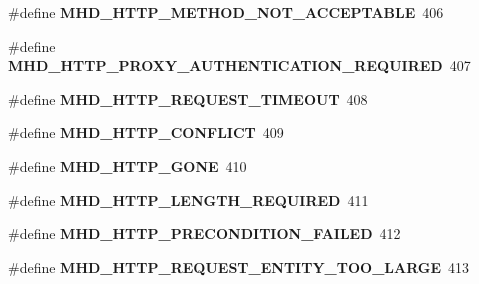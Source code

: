 \begin{DoxyCompactItemize}
\item 
\hypertarget{group__httpcode_ga1b1491025831c8bb6a52dc373b28faac}{\#define {\bfseries \-M\-H\-D\-\_\-\-H\-T\-T\-P\-\_\-\-M\-E\-T\-H\-O\-D\-\_\-\-N\-O\-T\-\_\-\-A\-C\-C\-E\-P\-T\-A\-B\-L\-E}~406}\label{group__httpcode_ga1b1491025831c8bb6a52dc373b28faac}

\item 
\hypertarget{group__httpcode_ga39c76f709f7aba08abdfe97de1ea07e2}{\#define {\bfseries \-M\-H\-D\-\_\-\-H\-T\-T\-P\-\_\-\-P\-R\-O\-X\-Y\-\_\-\-A\-U\-T\-H\-E\-N\-T\-I\-C\-A\-T\-I\-O\-N\-\_\-\-R\-E\-Q\-U\-I\-R\-E\-D}~407}\label{group__httpcode_ga39c76f709f7aba08abdfe97de1ea07e2}

\item 
\hypertarget{group__httpcode_gadd38da158e6694a6d1514006768f6800}{\#define {\bfseries \-M\-H\-D\-\_\-\-H\-T\-T\-P\-\_\-\-R\-E\-Q\-U\-E\-S\-T\-\_\-\-T\-I\-M\-E\-O\-U\-T}~408}\label{group__httpcode_gadd38da158e6694a6d1514006768f6800}

\item 
\hypertarget{group__httpcode_ga2339369af07b647381c2509aedf461c2}{\#define {\bfseries \-M\-H\-D\-\_\-\-H\-T\-T\-P\-\_\-\-C\-O\-N\-F\-L\-I\-C\-T}~409}\label{group__httpcode_ga2339369af07b647381c2509aedf461c2}

\item 
\hypertarget{group__httpcode_gaf552e9b3256250b64d24692d72b8bab1}{\#define {\bfseries \-M\-H\-D\-\_\-\-H\-T\-T\-P\-\_\-\-G\-O\-N\-E}~410}\label{group__httpcode_gaf552e9b3256250b64d24692d72b8bab1}

\item 
\hypertarget{group__httpcode_ga195e44ff3b8776066b230e4325df0169}{\#define {\bfseries \-M\-H\-D\-\_\-\-H\-T\-T\-P\-\_\-\-L\-E\-N\-G\-T\-H\-\_\-\-R\-E\-Q\-U\-I\-R\-E\-D}~411}\label{group__httpcode_ga195e44ff3b8776066b230e4325df0169}

\item 
\hypertarget{group__httpcode_ga8cac64b1e09326fe913a2ca372a902dc}{\#define {\bfseries \-M\-H\-D\-\_\-\-H\-T\-T\-P\-\_\-\-P\-R\-E\-C\-O\-N\-D\-I\-T\-I\-O\-N\-\_\-\-F\-A\-I\-L\-E\-D}~412}\label{group__httpcode_ga8cac64b1e09326fe913a2ca372a902dc}

\item 
\hypertarget{group__httpcode_gac31b027264743785bdc28074ea3a53e1}{\#define {\bfseries \-M\-H\-D\-\_\-\-H\-T\-T\-P\-\_\-\-R\-E\-Q\-U\-E\-S\-T\-\_\-\-E\-N\-T\-I\-T\-Y\-\_\-\-T\-O\-O\-\_\-\-L\-A\-R\-G\-E}~413}\label{group__httpcode_gac31b027264743785bdc28074ea3a53e1}


\end{DoxyCompactItemize}

